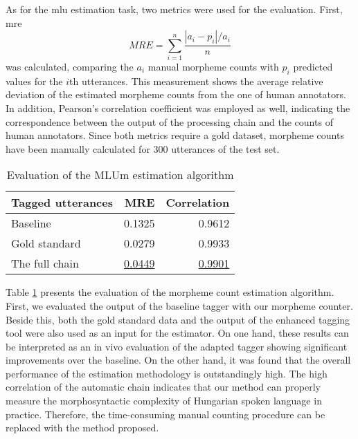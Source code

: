 As for the \acrshort{mlu} estimation task, two metrics were used for the evaluation. 
First, \acrlong{mre}
\begin{equation}
MRE = \sum_{i=1}^n \frac{|a_i-p_i|/a_i}{n}
\end{equation}
was calculated, comparing the $a_i$ manual morpheme counts with $p_i$ predicted values for the $i$th utterances. 
This measurement shows the average relative deviation of the estimated morpheme counts from the one of human annotators. 
In addition, Pearson's correlation coefficient was employed as well, indicating the correspondence between the output of the processing chain and the counts of human annotators. 
Since both metrics require a gold dataset, morpheme counts have been manually calculated for 300 utterances of the test set.


\begin{table}[H]
\centering
\caption{Evaluation of the MLUm estimation algorithm}
\label{tab:eval_est}
\begin{tabular}{ l r r} 
\hline
Tagged utterances & MRE & Correlation \\
\hline
Baseline &  0.1325  &  0.9612 \\
Gold standard &  0.0279 &  0.9933 \\
The full chain & \underline{0.0449} & \underline{0.9901} \\
\hline
\end{tabular}
\end{table}

Table \ref{tab:eval_est} presents the evaluation of the morpheme count estimation algorithm. 
First, we evaluated the output of the baseline tagger with our morpheme counter. 
Beside this, both the gold standard data and the output of the enhanced tagging tool were also used as an input for the estimator. %
On one hand, these results can be interpreted as an in vivo evaluation of the adapted tagger showing significant improvements over the baseline.
On the other hand, it was found that the overall performance of the estimation methodology is outstandingly high.  
The high correlation of the automatic chain indicates that our method can properly measure the morphosyntactic complexity of Hungarian spoken language in practice. 
Therefore, the time-consuming manual counting procedure can be replaced with the method proposed.